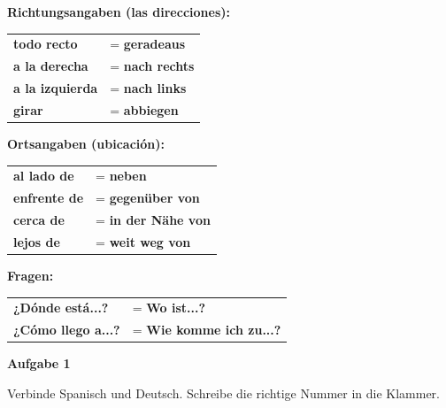 \documentclass[11pt, a4paper]{article}
\newcommand{\fachfarbe}{spanisch}
\newcommand{\punktebox}[1]{\hfill\fbox{\small \_/#1}}
\newcommand{\loesung}[1]{\textcolor{loesung}{\textbf{#1}}}
\newenvironment{aufgabe}[1]{%
    \needspace{5\baselineskip}%
    \nopagebreak[4]%
    \vspace{10pt}
    \noindent\textbf{\textcolor{\fachfarbe}{Aufgabe #1}}
    \nopagebreak[4]%
    \vspace{5pt}
    \nopagebreak[4]%
    \begin{list}{}{\leftmargin=0pt}
    \item[]
}{%
    \end{list}
}
\newcommand{\es}[1]{\textcolor{\fachfarbe}{\textbf{#1}}}
\begin{document}
\begin{merkkasten}
\textbf{Richtungsangaben (las direcciones):}

\vspace{0.5em}

\begin{tabular}{ll}
\es{todo recto} & = \loesung{geradeaus} \\[0.8em]
\es{a la derecha} & = \loesung{nach rechts} \\[0.8em]
\es{a la izquierda} & = \loesung{nach links} \\[0.8em]
\es{girar} & = \loesung{abbiegen} \\
\end{tabular}

\vspace{1em}

\textbf{Ortsangaben (ubicación):}

\vspace{0.5em}

\begin{tabular}{ll}
\es{al lado de} & = \loesung{neben} \\[0.8em]
\es{enfrente de} & = \loesung{gegenüber von} \\[0.8em]
\es{cerca de} & = \loesung{in der Nähe von} \\[0.8em]
\es{lejos de} & = \loesung{weit weg von} \\
\end{tabular}

\vspace{1em}

\textbf{Fragen:}

\vspace{0.5em}

\begin{tabular}{ll}
\es{¿Dónde está...?} & = \loesung{Wo ist...?} \\[0.8em]
\es{¿Cómo llego a...?} & = \loesung{Wie komme ich zu...?} \\
\end{tabular}

\end{merkkasten}

\vspace{15pt}


\begin{aufgabe}{1}
Verbinde Spanisch und Deutsch. Schreibe die richtige Nummer in die Klammer. \punktebox{4}
\end{aufgabe}
\end{document}
